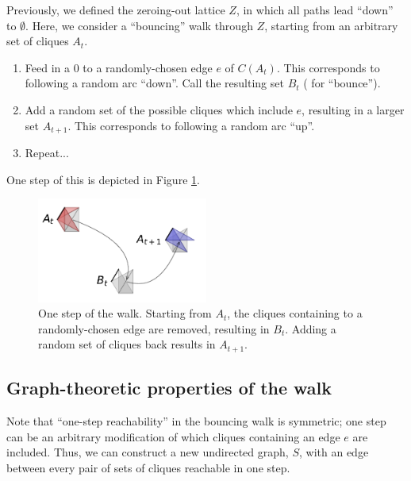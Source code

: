 \documentclass[12pt]{article}
\theoremstyle{definition}
\begin{document}
Previously, we defined the zeroing-out lattice $Z$, in which all paths lead
``down'' to $\emptyset$. Here, we consider a ``bouncing'' walk
through $Z$, starting from an arbitrary set of cliques $A_t$.

\begin{enumerate}

\item Feed in a 0 to a randomly-chosen edge $e$ of $C(A_t)$. 
This corresponds to
following a random arc ``down''. Call the resulting set $B_t$ (
for ``bounce'').

\item Add a random set of the possible cliques which include $e$,
resulting in a larger set $A_{t+1}$. This corresponds to following
a random arc ``up''.

\item Repeat...

\end{enumerate}

One step of this is depicted in Figure \ref{fig:boing}.

\begin{figure}

\centering

\includegraphics[width=0.5\textwidth]{bounce.pdf}

\caption{
One step of the walk. Starting from $A_t$, the cliques containing 
to a randomly-chosen edge are removed, resulting in $B_t$.
Adding a random set of cliques back results in $A_{t+1}$.
}
\label{fig:boing}

\end{figure}

\subsection{Graph-theoretic properties of the walk}
Note that ``one-step reachability'' in the bouncing walk is symmetric;
one step can be an arbitrary modification of which cliques containing 
an edge $e$ are included.
Thus, we can construct a new undirected graph, $S$, with an edge between every
pair of sets of cliques reachable in one step.
\end{document}
